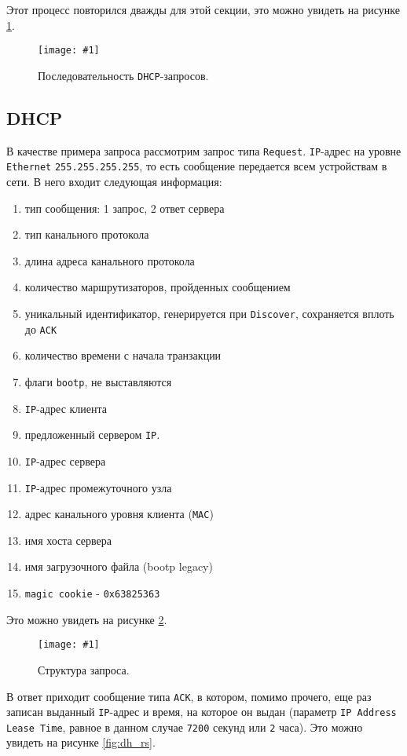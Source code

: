 \documentclass[12pt, a4paper]{article}
\newcommand{\figc}[4]{
  \begin{figure}[H]
  \begin{center}
    \texttt{[image: \#1]}
    \caption{#2}
    \label{fig:#3}
  \end{center}
  \end{figure}
}
\begin{document}
Этот процесс повторился дважды для этой секции, это можно увидеть на рисунке
\ref{fig:dh_his}.

\figc{dhcp_history}{Последовательность \texttt{DHCP}-запросов.}{dh_his}{2.5}

\subsection{DHCP}

В качестве примера запроса рассмотрим запрос типа \texttt{Request}.
\texttt{IP}-адрес на уровне \texttt{Ethernet} \texttt{255.255.255.255}, то есть
сообщение передается всем устройствам в сети. В него
входит следующая информация:

\begin{enumerate}
  \item тип сообщения: 1 запрос, 2 ответ сервера
  \item тип канального протокола
  \item длина адреса канального протокола
  \item количество маршрутизаторов, пройденных сообщением
  \item уникальный идентификатор, генерируется при
    \texttt{Discover}, сохраняется вплоть до \texttt{ACK}
  \item количество времени с начала транзакции
  \item флаги \texttt{bootp}, не выставляются
  \item \texttt{IP}-адрес клиента
  \item предложенный сервером \texttt{IP}.
  \item \texttt{IP}-адрес сервера
  \item \texttt{IP}-адрес промежуточного узла
  \item адрес канального уровня клиента (\texttt{MAC})
  \item имя хоста сервера
  \item имя загрузочного файла (bootp legacy)
  \item \texttt{magic cookie} - \texttt{0x63825363}
\end{enumerate}

Это можно увидеть на рисунке \ref{fig:dh_rq}.

\figc{dhcp_req}{Структура запроса.}{dh_rq}{2.5}

В ответ приходит сообщение типа \texttt{ACK}, в котором, помимо прочего,
еще раз записан выданный \texttt{IP}-адрес и время, на которое он выдан
(параметр \texttt{IP Address Lease Time}, равное в данном случае \texttt{7200}
секунд или \texttt{2} часа). Это можно увидеть на рисунке \ref{fig:dh_rs}.
\end{document}
